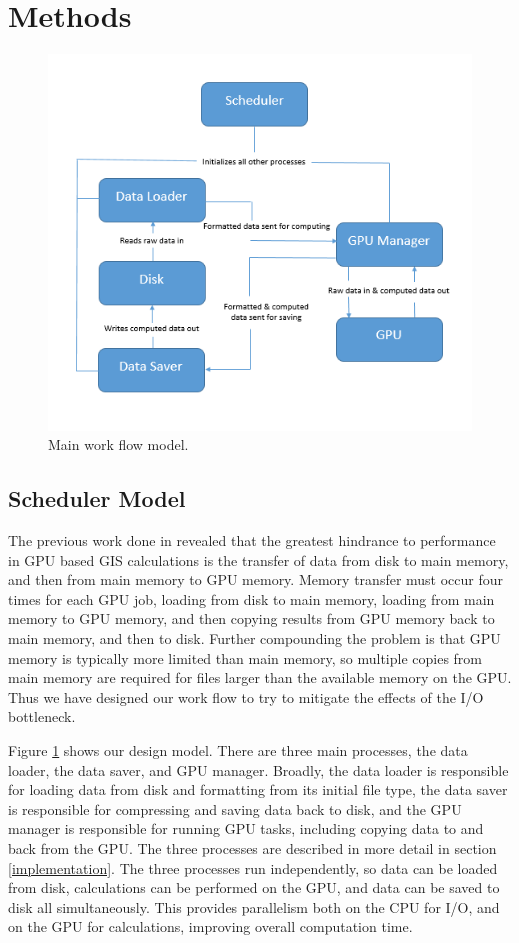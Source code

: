 \documentclass[journal]{IEEEtran}
\begin{document}
\section{Methods} \label{methods}
    \begin{figure}
        \includegraphics[width=\linewidth]{model2.png}
        \caption{Main work flow model.}
        \label{model}
    \end{figure}
    \subsection{Scheduler Model}
    The previous work done in \cite{hpc_cuda} revealed that the greatest
    hindrance to performance in GPU based GIS calculations is the transfer of
    data from disk to main memory, and then from main memory to GPU memory.
    Memory transfer must occur four times for each GPU job, loading from disk
    to main memory, loading from main memory to GPU memory, and then copying
    results from GPU memory back to main memory, and then to disk.  Further
    compounding the problem is that GPU memory is typically more limited than
    main memory, so multiple copies from main memory are required for files
    larger than the available memory on the GPU. Thus we have designed our
    work flow to try to mitigate the effects of the I/O bottleneck.

    Figure \ref{model} shows our design model. There are three main processes,
    the data loader, the data saver, and GPU manager. Broadly, the data loader
    is responsible for loading data from disk and formatting from its initial
    file type, the data saver is responsible for compressing and saving data
    back to disk, and the GPU manager is responsible for running GPU tasks,
    including copying data to and back from the GPU. The three processes are
    described in more detail in section \ref{implementation}. The three
    processes run independently, so data can be loaded from disk, calculations
    can be performed on the GPU, and data can be saved to disk all
    simultaneously.  This provides parallelism both on the CPU for I/O, and on
    the GPU for calculations, improving overall computation time.
    
\end{document}
